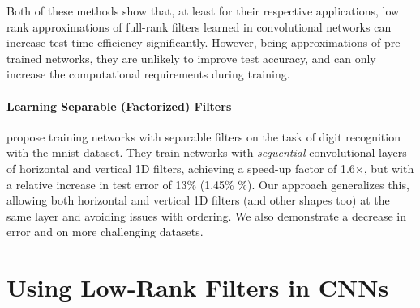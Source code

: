 \documentclass[thesis]{subfiles}
\begin{document}
    Both of these methods show that, at least for their respective applications, low rank approximations of full-rank filters learned in convolutional networks can increase test-time efficiency significantly. However, being approximations of pre-trained networks, they are unlikely to improve test accuracy, and can only increase the computational requirements during training.
    
    \paragraph{Learning Separable (Factorized) Filters}
    \label{factorized}
    \citet{mamalet2012simplifying} propose training networks with separable filters on the task of digit recognition with the \gls{mnist} dataset. They train networks with \emph{sequential} convolutional layers of horizontal and vertical 1D filters, achieving a speed-up factor of 1.6$\times$, but with a relative increase in test error of 13\% (1.45\% \%). Our approach generalizes this, allowing both horizontal and vertical 1D filters (and other shapes too) at the same layer and avoiding issues with ordering.  We also demonstrate a decrease in error and on more challenging datasets.
    
    
    \section{Using Low-Rank Filters in CNNs}
    
\end{document}
